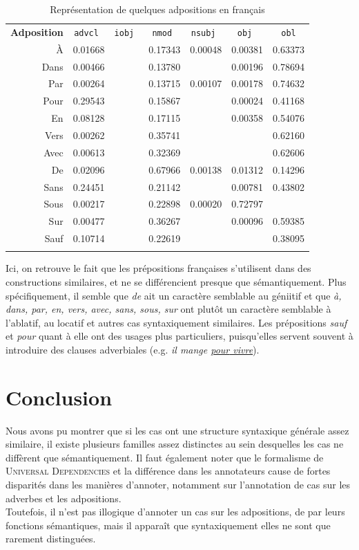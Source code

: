 \documentclass{cours}
\begin{document}
\begin{table}[H]
	\centering
	\renewcommand{\arraystretch}{1.3}
	\begin{NiceTabular}{>{\sc}rcccccc}
		\bf Adposition & \tt advcl &\tt iobj & \tt nmod & \tt nsubj & \tt obj & \tt obl\\
		À    & 0.01668 &  & 0.17343 & 0.00048 & 0.00381 & 0.63373\\
		Dans & 0.00466 & & 0.13780 &  & 0.00196 & 0.78694\\
		Par  & 0.00264 &  & 0.13715 & 0.00107 & 0.00178 & 0.74632\\
		Pour & 0.29543 & & 0.15867 &  & 0.00024 & 0.41168\\
		En   & 0.08128 &  & 0.17115 & & 0.00358 & 0.54076\\
		Vers & 0.00262 &  & 0.35741 & & & 0.62160\\
		Avec & 0.00613 & & 0.32369 &  &  & 0.62606\\
		De   & 0.02096 &  & 0.67966 & 0.00138 & 0.01312 & 0.14296\\
		Sans & 0.24451 & & 0.21142 & & 0.00781 & 0.43802\\
		Sous & 0.00217 & & 0.22898 & 0.00020 & 0.72797 & \\
		Sur  & 0.00477 & & 0.36267 &  & 0.00096 & 0.59385\\
		Sauf & 0.10714 & & 0.22619 & & & 0.38095\\
	\CodeAfter
	\end{NiceTabular}
	\caption{Représentation de quelques adpositions en français}
	\label{tab:adpos_fr}
\end{table}
Ici, on retrouve le fait que les prépositions françaises s'utilisent dans des constructions similaires, et ne se différencient presque que sémantiquement.
Plus spécifiquement, il semble que \textsl{de} ait un caractère semblable au géniitif et que \textsl{à, dans, par, en, vers, avec, sans, sous, sur} ont plutôt un caractère semblable à l'ablatif, au locatif et autres cas syntaxiquement similaires.
Les prépositions \textsl{sauf} et \textsl{pour} quant à elle ont des usages plus particuliers, puisqu'elles servent souvent à introduire des clauses adverbiales (e.g. \textsl{il mange \ul{\emph{pour} vivre}}).

\section{Conclusion}
Nous avons pu montrer que si les cas ont une structure syntaxique générale assez similaire, il existe plusieurs familles assez distinctes au sein desquelles les cas ne diffèrent que sémantiquement.
Il faut également noter que le formalisme de \textsc{Universal Dependencies} et la différence dans les annotateurs cause de fortes disparités dans les manières d'annoter, notamment sur l'annotation de cas sur les adverbes et les adpositions.\\
Toutefois, il n'est pas illogique d'annoter un cas sur les adpositions, de par leurs fonctions sémantiques, mais il apparaît que syntaxiquement elles ne sont que rarement distinguées.

\appendix



\end{document}
